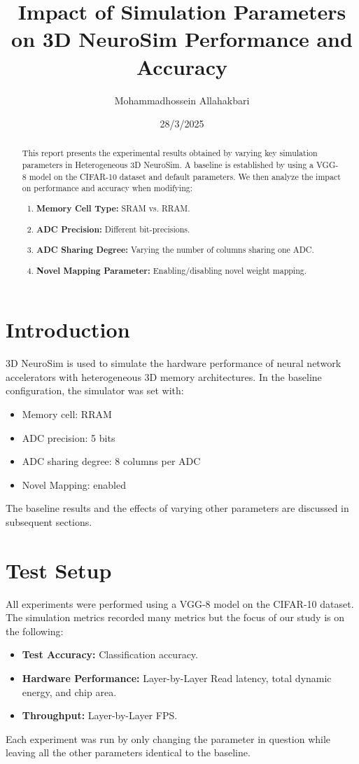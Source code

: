 \documentclass[11pt]{article}
\title{Impact of Simulation Parameters on 3D NeuroSim Performance and Accuracy}
\author{Mohammadhossein Allahakbari}
\date{28/3/2025}
\begin{document}
\maketitle

\begin{abstract}
This report presents the experimental results obtained by varying key simulation parameters in Heterogeneous 3D NeuroSim. A baseline is established by using a VGG-8 model on the CIFAR-10 dataset and default parameters. We then analyze the impact on performance and accuracy when modifying:
\begin{enumerate}
    \item \textbf{Memory Cell Type:} SRAM vs. RRAM.
    \item \textbf{ADC Precision:} Different bit-precisions.
    \item \textbf{ADC Sharing Degree:} Varying the number of columns sharing one ADC.
    \item \textbf{Novel Mapping Parameter:} Enabling/disabling novel weight mapping.
\end{enumerate}
\end{abstract}

\section{Introduction}
3D NeuroSim is used to simulate the hardware performance of neural network accelerators with heterogeneous 3D memory architectures. In the baseline configuration, the simulator was set with:
\begin{itemize}
    \item Memory cell: RRAM
    \item ADC precision: 5 bits
    \item ADC sharing degree: 8 columns per ADC
    \item Novel Mapping: enabled
\end{itemize}
The baseline results and the effects of varying other parameters are discussed in subsequent sections.

\section{Test Setup}
All experiments were performed using a VGG-8 model on the CIFAR-10 dataset. The simulation metrics recorded many metrics but the focus of our study is on the following:
\begin{itemize}
    \item \textbf{Test Accuracy:} Classification accuracy.
    \item \textbf{Hardware Performance:} Layer-by-Layer Read latency, total dynamic energy, and chip area.
    \item \textbf{Throughput:} Layer-by-Layer FPS.
\end{itemize}
Each experiment was run by only changing the parameter in question while leaving all the other parameters identical to the baseline.
\end{document}
